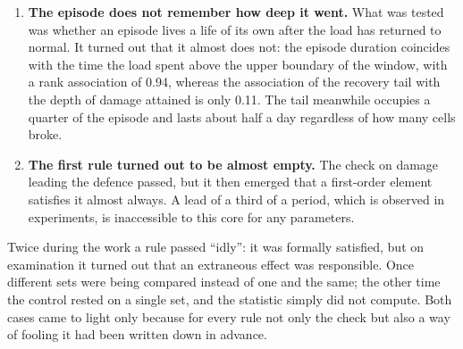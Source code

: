 \begin{enumerate}
\item \textbf{The episode does not remember how deep it went.} What was tested was whether an episode lives a life of its own after the load has returned to normal. It turned out that it almost does not: the episode duration coincides with the time the load spent above the upper boundary of the window, with a rank association of 0.94, whereas the association of the recovery tail with the depth of damage attained is only 0.11. The tail meanwhile occupies a quarter of the episode and lasts about half a day regardless of how many cells broke.\tD
\item \textbf{The first rule turned out to be almost empty.} The check on damage leading the defence passed, but it then emerged that a first-order element satisfies it almost always. A lead of a third of a period, which is observed in experiments, is inaccessible to this core for any parameters.\tD
\end{enumerate}

\begin{note}
Twice during the work a rule passed ``idly'': it was formally satisfied, but on examination it turned out that an extraneous effect was responsible. Once different sets were being compared instead of one and the same; the other time the control rested on a single set, and the statistic simply did not compute. Both cases came to light only because for every rule not only the check but also a way of fooling it had been written down in advance.
\end{note}
